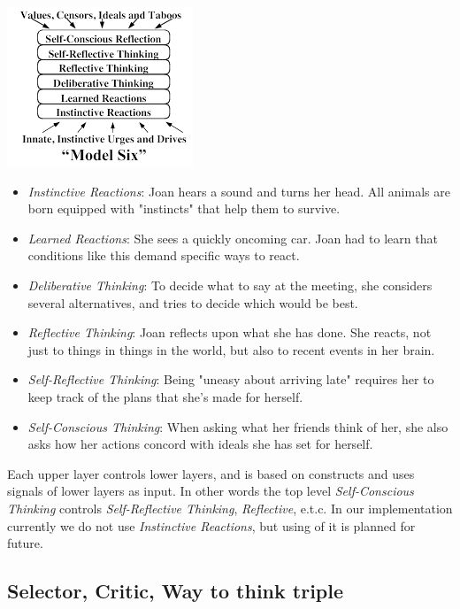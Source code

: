 \documentclass[conference]{IEEEtran}
\begin{document}
\includegraphics[scale=0.9]{model_6.png}

\begin{itemize}
 \item \emph{Instinctive Reactions}:  Joan hears a sound and turns her head. All animals are born equipped with "instincts" that help them to survive.
 \item \emph{Learned Reactions}: She sees a quickly oncoming car. Joan had to learn that conditions like this demand specific ways to react.
 \item \emph{Deliberative Thinking}: To decide what to say at the meeting, she considers several alternatives, and tries to decide which would be best.
 \item \emph{Reflective Thinking}: Joan reflects upon what she has done. She reacts, not just to things in things in the world, but also to recent events in her brain.
 \item \emph{Self-Reflective Thinking}: Being "uneasy about arriving late" requires her to keep track of the plans that she's made for herself.
 \item \emph{Self-Conscious Thinking}: When asking what her friends think of her, she also asks how her actions concord with ideals she has set for herself.
\end{itemize}

Each upper layer controls lower layers, and is based on constructs and uses signals of lower layers as input. In other words the top level \emph{Self-Conscious Thinking} controls \emph{Self-Reflective Thinking}, \emph{Reflective}, e.t.c.
In our implementation currently we do not use \emph{Instinctive Reactions}, but using of it is planned for future.

\subsection{Selector, Critic, Way to think triple}
\end{document}
